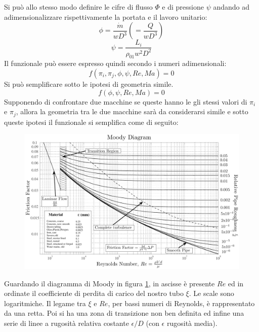 Si può allo stesso modo deﬁnire le cifre di ﬂusso $\Phi$ e di pressione $\psi$ andando ad adimensionalizzare rispettivamente la portata e il lavoro unitario:
\begin{equation}
\phi = \frac{\dot{m}}{w D^3} \left( =\frac{Q}{w D^3} \right)
\end{equation}
\begin{equation}
\psi = \frac{L_i}{\rho_{01} w^2 D^2}
\end{equation}
Il funzionale può essere espresso quindi secondo i numeri adimensionali:
\begin{equation}
f(\pi_i,\pi_j,\phi,\psi,Re,Ma)=0
\end{equation}
Si può semplificare sotto le ipotesi di geometria simile.
\begin{equation}
f(\phi,\psi,Re,Ma)=0
\end{equation}
Supponendo di confrontare due macchine se queste hanno le gli stessi valori di $\pi_i$ e $\pi_j$, allora la geometria tra le due macchine sarà da considerarsi simile e sotto queste ipotesi il funzionale si semplifica come di seguito:
\begin{figure}
\centering
  \includegraphics[width=\textwidth]{fig/moody.jpg}
\caption{}
\label{fig:moody}
\end{figure}
Guardando il diagramma di Moody in figura \ref{fig:moody}, in ascisse è presente $Re$ ed in ordinate il coefficiente di perdita di carico del nostro tubo $\xi$. Le scale sono logaritmiche. Il legame tra $\xi$ e $Re$, per bassi numeri di Reynolds, è rappresentato da una retta. Poi si ha una zona di transizione non ben definita ed infine una serie di linee a rugosità relativa costante $\epsilon/D$ (con $\epsilon$ rugosità media).

